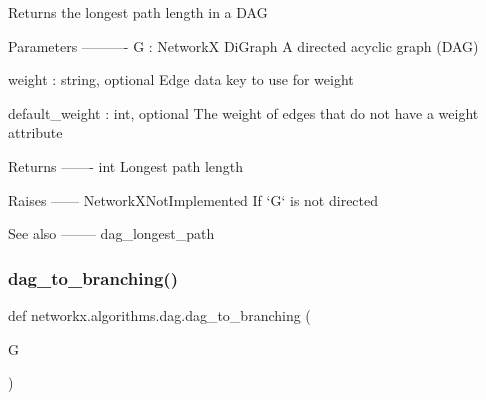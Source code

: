 \begin{DoxyVerb}Returns the longest path length in a DAG

Parameters
----------
G : NetworkX DiGraph
    A directed acyclic graph (DAG)

weight : string, optional
    Edge data key to use for weight

default_weight : int, optional
    The weight of edges that do not have a weight attribute

Returns
-------
int
    Longest path length

Raises
------
NetworkXNotImplemented
    If `G` is not directed

See also
--------
dag_longest_path
\end{DoxyVerb}
 \mbox{\label{namespacenetworkx_1_1algorithms_1_1dag_ac63ef5d8c287a81f02cc897e51cc662f}} 
\subsubsection{\texorpdfstring{dag\+\_\+to\+\_\+branching()}{dag\_to\_branching()}}
{\footnotesize\ttfamily def networkx.\+algorithms.\+dag.\+dag\+\_\+to\+\_\+branching (\begin{DoxyParamCaption}\item[{}]{G }\end{DoxyParamCaption})}

